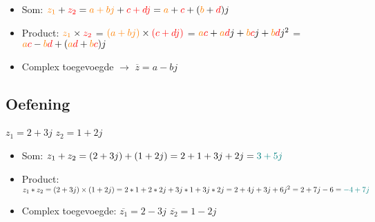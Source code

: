 \documentclass[12pt]{report}
\newcommand{\answercolor}{teal}
\newcommand{\mathimportant}[2] {\textbf{\color{#2}$#1$}}
\begin{document}
\begin{itemize}
 \item Som: $\mathimportant{z_1}{orange} + \mathimportant{z_2}{red}
\newline
= \mathimportant{a + bj}{orange} + \mathimportant{c + dj}{red} 
\newline
= \mathimportant{a}{orange} + \mathimportant{c}{red} + (\mathimportant{b}{orange} + \mathimportant{d}{red})j$ 
  \item Product: $\mathimportant{z_1}{orange} \times \mathimportant{z_2}{red}$ 
\newline
  = $\mathimportant{(a + bj)}{orange} \times \mathimportant{(c + dj)}{red}$
\newline
  = $\mathimportant{a}{orange}\mathimportant{c}{red} + \mathimportant{a}{orange}\mathimportant{d}{red}j + \mathimportant{b}{orange}\mathimportant{c}{red}j + \mathimportant{b}{orange}\mathimportant{d}{red}j^2$
\newline
  = $\mathimportant{a}{orange}\mathimportant{c}{red} - \mathimportant{b}{orange}\mathimportant{d}{red} + (\mathimportant{a}{orange}\mathimportant{d}{red} + \mathimportant{b}{orange}\mathimportant{c}{red})j$
  \item Complex toegevoegde $\rightarrow$  $\overline{z} = a - bj$
\end{itemize}

\subsection{Oefening}
$z_1 = 2 + 3j$
\newline
$z_2 = 1 + 2j$

\begin{itemize}
 \item Som: $z_1 + z_2 
 \newline
 = (2 + 3j) + (1 + 2j) 
 \newline
 = 2 + 1 + 3j + 2j 
 \newline
 = \mathimportant{3 + 5j}{\answercolor}$ 
 \item Product: $z_1 * z_2 
 \newline
 = (2 + 3j) \times (1 + 2j) 
  \newline
 = 2 * 1 + 2 * 2j + 3j * 1 + 3j * 2j 
  \newline
 = 2 + 4j + 3j + 6j^2 
  \newline
 = 2 + 7j -6
  \newline
 = \mathimportant{-4 + 7j}{\answercolor}$
 \item Complex toegevoegde: \newline
 $\overline{z_1} = 2 - 3j$
 \newline
 $\overline{z_2} = 1 - 2j$
\end{itemize}
\end{document}
